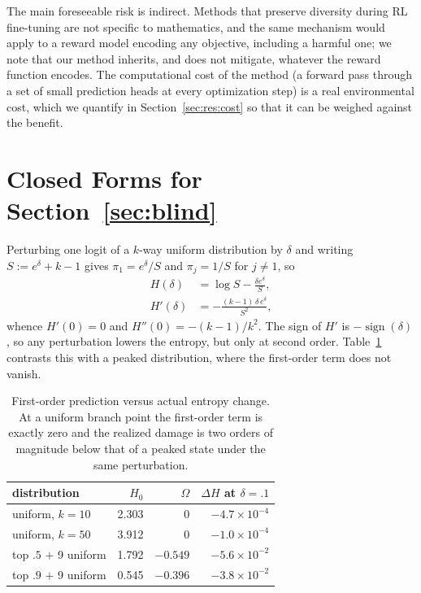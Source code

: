 \documentclass[11pt]{article}
\newcommand{\Om}{\Omega}
\begin{document}
The main foreseeable risk is indirect. Methods that preserve diversity during RL
fine-tuning are not specific to mathematics, and the same mechanism would apply to a
reward model encoding any objective, including a harmful one; we note that our
method inherits, and does not mitigate, whatever the reward function encodes. The
computational cost of the method (a forward pass through a set of small prediction
heads at every optimization step) is a real environmental cost, which we quantify in
Section~\ref{sec:res:cost} so that it can be weighed against the benefit.



\appendix

\section{Closed Forms for Section~\ref{sec:blind}}
\label{sec:appendix-closed}

Perturbing one logit of a $k$-way uniform distribution by $\delta$ and writing
$S := e^{\delta} + k - 1$ gives $\pi_1 = e^{\delta}/S$ and $\pi_j = 1/S$ for
$j \neq 1$, so
%
\begin{equation*}
\begin{split}
H(\delta) &= \log S - \frac{\delta e^{\delta}}{S},\\
H'(\delta) &= -\frac{(k-1)\,\delta\, e^{\delta}}{S^{2}},
\end{split}
\end{equation*}
%
whence $H'(0) = 0$ and $H''(0) = -(k-1)/k^{2}$. The sign of $H'$ is
$-\operatorname{sign}(\delta)$, so any perturbation lowers the entropy, but only at
second order. Table~\ref{tab:secondorder} contrasts this with a peaked distribution,
where the first-order term does not vanish.

\begin{table}[h]
\centering
\footnotesize
\begin{tabular}{@{}lrrr@{}}
\toprule
distribution & $H_0$ & $\Om$ & $\Delta H$ at $\delta{=}.1$ \\
\midrule
uniform, $k{=}10$      & 2.303 & $0$      & $-4.7\times10^{-4}$ \\
uniform, $k{=}50$      & 3.912 & $0$      & $-1.0\times10^{-4}$ \\
top $.5$ $+$ 9 uniform & 1.792 & $-0.549$ & $-5.6\times10^{-2}$ \\
top $.9$ $+$ 9 uniform & 0.545 & $-0.396$ & $-3.8\times10^{-2}$ \\
\bottomrule
\end{tabular}
\caption{First-order prediction versus actual entropy change. At a uniform branch
point the first-order term is exactly zero and the realized damage is two orders of
magnitude below that of a peaked state under the same perturbation.}
\label{tab:secondorder}
\end{table}
\end{document}
